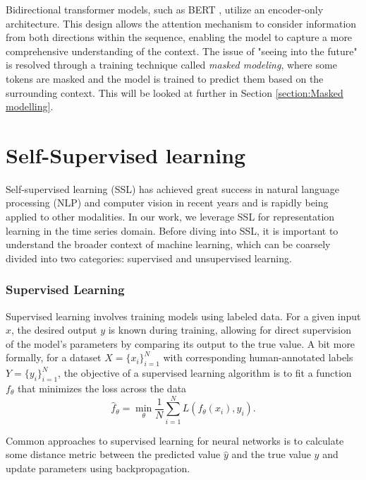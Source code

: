 \documentclass[../../thesis.tex]{subfiles}
\begin{document}
Bidirectional transformer models, such as BERT \cite{devlin2019bert}, utilize an encoder-only architecture. This design allows the attention mechanism to consider information from both directions within the sequence, enabling the model to capture a more comprehensive understanding of the context. The issue of "seeing into the future" is resolved through a training technique called \textit{masked modeling}, where some tokens are masked and the model is trained to predict them based on the surrounding context. This will be looked at further in Section \ref{section:Masked modelling}.

\section{Self-Supervised learning}

Self-supervised learning (SSL) has achieved great success in natural language processing (NLP) and computer vision in recent years and is rapidly being applied to other modalities. In our work, we leverage SSL for representation learning in the time series domain. Before diving into SSL, it is important to understand the broader context of machine learning, which can be coarsely divided into two categories: supervised and unsupervised learning.
\newline

\subsubsection*{Supervised Learning}

Supervised learning involves training models using labeled data. For a given input $x$, the desired output $y$ is known during training, allowing for direct supervision of the model's parameters by comparing its output to the true value. A bit more formally, for a dataset $X = \{x_i\}_{i=1}^N$ with corresponding human-annotated labels $Y = \{y_i\}_{i=1}^N$, the objective of a supervised learning algorithm is to fit a function $f_\theta$ that minimizes the loss across the data
\begin{equation}
    \widehat{f}_\theta = \min_\theta \frac{1}{N} \sum_{i=1}^N L(f_\theta(x_i),y_i).
\end{equation}

Common approaches to supervised learning for neural networks is to calculate some distance metric between the predicted value $\widehat{y}$ and the true value $y$ and update parameters using backpropagation.\newline
\end{document}
